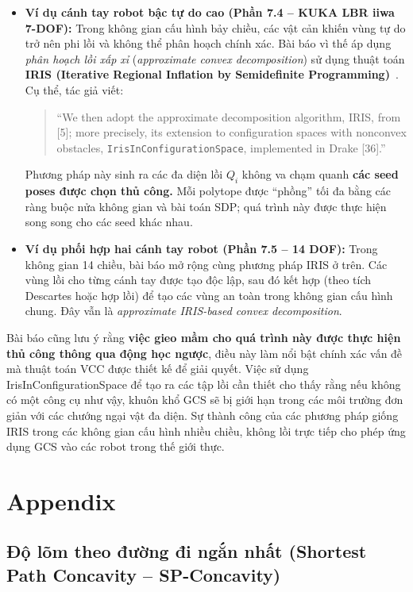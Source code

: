\documentclass{article}
\begin{document}
\begin{itemize}
\begin{itemize}
\end{itemize}

  \item \textbf{Ví dụ cánh tay robot bậc tự do cao (Phần 7.4 -- KUKA LBR iiwa 7-DOF):}  
  Trong không gian cấu hình bảy chiều, các vật cản khiến vùng tự do trở nên phi lồi và không thể phân hoạch chính xác.  
  Bài báo vì thế áp dụng \textit{phân hoạch lồi xấp xỉ} (\textit{approximate convex decomposition}) sử dụng thuật toán \textbf{IRIS (Iterative Regional Inflation by Semidefinite Programming)}~\cite{DeitsTedrake2014}.  
  Cụ thể, tác giả viết:
  \begin{quote}
    ``We then adopt the approximate decomposition algorithm, IRIS, from [5]; more precisely, its extension to configuration spaces with nonconvex obstacles, \texttt{IrisInConfigurationSpace}, implemented in Drake [36].''
  \end{quote}
  Phương pháp này sinh ra các đa diện lồi \( Q_i \) không va chạm quanh \textbf{các seed poses được chọn thủ công.}  
  Mỗi polytope được ``phồng'' tối đa bằng các ràng buộc nửa không gian và bài toán SDP; quá trình này được thực hiện song song cho các seed khác nhau.

  \item \textbf{Ví dụ phối hợp hai cánh tay robot (Phần 7.5 -- 14 DOF):}  
  Trong không gian 14 chiều, bài báo mở rộng cùng phương pháp IRIS ở trên.  
  Các vùng lồi cho từng cánh tay được tạo độc lập, sau đó kết hợp (theo tích Descartes hoặc hợp lồi) để tạo các vùng an toàn trong không gian cấu hình chung.  
  Đây vẫn là \textit{approximate IRIS-based convex decomposition}.
\end{itemize}


Bài báo cũng lưu ý rằng \textbf{việc gieo mầm cho quá trình này được thực hiện thủ công thông qua động học ngược}, điều này làm nổi bật chính xác vấn đề mà thuật toán VCC được thiết kế để giải quyết. Việc sử dụng IrisInConfigurationSpace để tạo ra các tập lồi cần thiết cho thấy rằng nếu không có một công cụ như vậy, khuôn khổ GCS sẽ bị giới hạn trong các môi trường đơn giản với các chướng ngại vật đa diện. Sự thành công của các phương pháp giống IRIS trong các không gian cấu hình nhiều chiều, không lồi trực tiếp cho phép ứng dụng GCS vào các robot trong thế giới thực.

\section{Appendix}

\subsection{Độ lõm theo đường đi ngắn nhất (Shortest Path Concavity – SP-Concavity)}
\label{sec:SP-Concavity}
\end{document}
